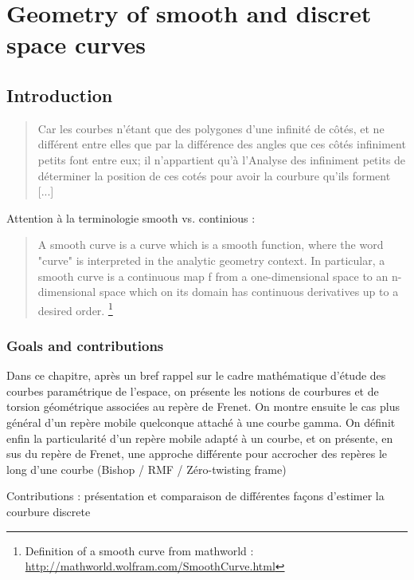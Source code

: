 \chapter{Geometry of smooth and discret space curves}
\section{Introduction}


\blockcquote[Liebniz]{}{Car les courbes n’étant que des polygones d’une infinité de côtés, et ne différent
entre elles que par la différence des angles que ces côtés infiniment petits font
entre eux; il n’appartient qu’à l’Analyse des infiniment petits de déterminer la
position de ces cotés pour avoir la courbure qu’ils forment [...]}.

Attention à la terminologie smooth vs. continious :

\blockquote{A smooth curve is a curve which is a smooth function, where the word "curve" is interpreted in the analytic geometry context. In particular, a smooth curve is a continuous map f from a one-dimensional space to an n-dimensional space which on its domain has continuous derivatives up to a desired order. \footnote{Definition of a smooth curve from mathworld : \url{http://mathworld.wolfram.com/SmoothCurve.html}}
} 

\subsection{Goals and contributions}
Dans ce chapitre, après un bref rappel sur le cadre mathématique d'étude des courbes paramétrique de l'espace, on présente les notions de courbures et de torsion géométrique associées au repère de Frenet. On montre ensuite le cas plus général d'un repère mobile quelconque attaché à une courbe gamma. On définit enfin la particularité d'un repère mobile adapté à un courbe, et on présente, en sus du repère de Frenet, une approche différente pour accrocher des repères le long d'une courbe (Bishop / RMF / Zéro-twisting frame)

Contributions : présentation et comparaison de différentes façons d'estimer la courbure discrete

